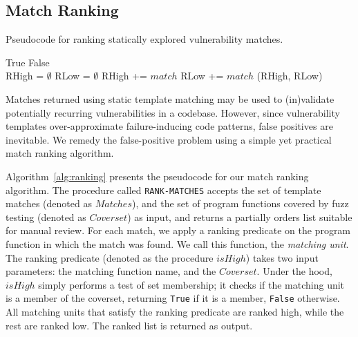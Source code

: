 
\subsection{Match Ranking}
\label{sec:mine}


\begin{algorithm}[!t]
\caption{Pseudocode for ranking statically explored vulnerability matches.}
\label{alg:ranking}

\begin{algorithmic}[1]
\State {}
               \Return True
               \EndIf
\EndFor
\State \Return False
\EndFunction
\\
\State RHigh = $\emptyset$
\State RLow = $\emptyset$
\State {}
\State RHigh += $match$
\Else
\State RLow += $match$
\EndIf
\EndFor
\State \Return (RHigh, RLow)
\EndFunction
\end{algorithmic}
\end{algorithm}

Matches returned using static template matching may be used to (in)validate potentially recurring vulnerabilities in a codebase.
However, since vulnerability templates over-approximate failure-inducing code patterns, false positives are inevitable.
We remedy the false-positive problem using a simple yet practical match ranking algorithm.

Algorithm~\ref{alg:ranking} presents the pseudocode for our match ranking algorithm.
The procedure called {\tt RANK-MATCHES} accepts the set of template matches (denoted as $Matches$), and the set of program functions covered by fuzz testing (denoted as $Coverset$)  as input, and returns a partially orders list suitable for manual review.
For each match, we apply a ranking predicate on the program function in which the match was found.
We call this function, the {\it matching unit}.
The ranking predicate (denoted as the procedure $isHigh$) takes two input parameters: the matching function name, and the $Coverset$.
Under the hood, $isHigh$ simply performs a test of set membership; it checks if the matching unit is a member of the coverset, returning {\tt True} if it is a member, {\tt False} otherwise.
All matching units that satisfy the ranking predicate are ranked high, while the rest are ranked low.
The ranked list is returned as output.

